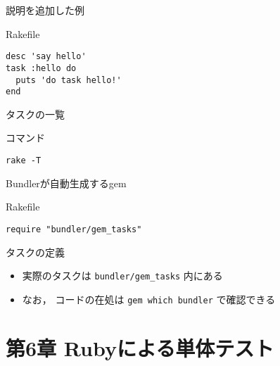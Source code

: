\documentclass[t, aspectratio=169]{beamer}
\begin{document}
\begin{frame}[fragile,label=sec-5-2-2]{説明を追加した例}
 \begin{block}{Rakefile}
\begin{verbatim}
desc 'say hello'
task :hello do
  puts 'do task hello!'
end
\end{verbatim}
\end{block}
\end{frame}

\begin{frame}[fragile,label=sec-5-2-3]{タスクの一覧}
 \begin{block}{コマンド}
\begin{verbatim}
rake -T
\end{verbatim}
\end{block}
\end{frame}

\begin{frame}[fragile,label=sec-5-2-4]{Bundlerが自動生成するgem}
 \begin{block}{Rakefile}
\begin{verbatim}
require "bundler/gem_tasks"
\end{verbatim}
\end{block}

\begin{block}{タスクの定義}
\begin{itemize}
\item 実際のタスクは \texttt{bundler/gem\_tasks} 内にある
\item なお， コードの在処は \texttt{gem which bundler} で確認できる
\end{itemize}
\end{block}
\end{frame}

\part{第6章 Rubyによる単体テスト}
\label{sec-6}
\end{document}

